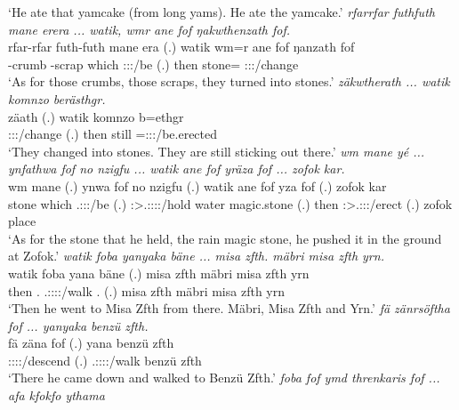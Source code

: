 \begin{exe}
	\trans `He ate that yamcake (from long yams). He ate the yamcake.'
	\emph{rfarrfar futhfuth mane erera ... watik, wmr ane fof ŋakwthenzath fof.}\\
	\gll rfar-rfar futh-futh mane era (.) watik wm=r ane fof ŋanzath fof\\ 
	\Redup-crumb{} \Redup-scrap which \Sg:\Sbj:\Pst:\Ipfv/be (.) then stone={\Purp} {\Dem} {\Emph} \Stpl:\Sbj:\Pst:\Ipfv/change {\Emph}\\
	\trans `As for those crumbs, those scraps, they turned into stones.'
	\emph{zäkwtherath ... watik komnzo berästhgr.}\\
	\gll zäath (.) watik komnzo b=ethgr\\ 
	\Stpl:\Sbj:\Pst:\Pfv/change (.) then still \Med=\Stpl:\Sbj:\Nonpast:\Stat/be.erected\\
	\trans `They changed into stones. They are still sticking out there.'
	\emph{wm mane yé ... ynfathwa fof no nzigfu ... watik ane fof yräza fof ... zofok kar.}\\
	\gll wm mane  (.) ynwa fof no nzigfu (.) watik ane fof yza fof (.) zofok kar\\ 
	stone which \Tsg.\Masc:\Sbj:\Nonpast:\Ipfv/be (.) \Sg:\Sbj>\Tsg.\Masc:\Obj:\Pst:\Ipfv:\Venit/hold {\Emph} water magic.stone (.) then {\Dem} {\Emph} \Sg:\Sbj>\Tsg.\Masc:\Obj:\Nonpast:\Ipfv/erect {\Emph} (.) zofok place\\
	\trans `As for the stone that he held, the rain magic stone, he pushed it in the ground at Zofok.'
	\emph{watik foba yanyaka bäne ... misa zfth. mäbri misa zfth yrn.}\\
	\gll watik foba yana bäne (.) {misa zfth} mäbri {misa zfth} yrn\\ 
	then \Dist.{\Abl} \Tsg.\Masc:\Sbj:\Pst:\Ipfv:\Venit/walk \Recog.{\Abs} (.) {misa zfth} mäbri {misa zfth} yrn\\
	\trans `Then he went to Misa Zfth from there. Mäbri, Misa Zfth and Yrn.'
	\emph{fä zänrsöftha fof ... yanyaka benzü zfth.}\\
	\gll fä zäna fof (.) yana {benzü zfth}\\ 
	{\Dist} \Sg:\Sbj:\Pst:\Pfv:\Venit/descend {\Emph} (.) \Tsg.\Masc:\Sbj:\Pst:\Ipfv:\Venit/walk {benzü zfth}\\
	\trans `There he came down and walked to Benzü Zfth.'
	\emph{foba fof ymd threnkaris fof ... afa kfokfo ythama}\\

\end{exe}
